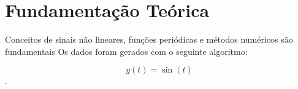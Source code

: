 \section{Fundamentação Teórica}

Conceitos de sinais não lineares, funções periódicas e métodos numéricos são fundamentais
Os dados foram gerados com o seguinte algoritmo:

\begin{equation}
    y(t) = \sin(t)
\end{equation}.

